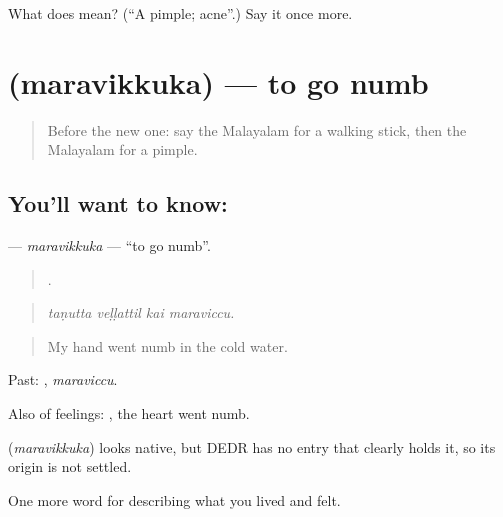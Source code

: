 \begin{tcolorbox}[breakable,colback=teal!4,colframe=teal!35!black,title={Before you move on}]
What does  mean? (\textquotedblleft{}A pimple; acne\textquotedblright{}.) Say it once more.
\end{tcolorbox}
\section[\texorpdfstring{\ml{മരവിക്കുക} (maravikkuka)}{മരവിക്കുക (maravikkuka)}]{ (maravikkuka) — to go numb}

\label{lesson:ML-C540-maravikkuka}



\begin{quote}
Before the new one: say the Malayalam for a walking stick, then the Malayalam for a pimple.
\end{quote}

\subsection*{You'll want to know: }
\textbf{} — \emph{maravikkuka} — \textquotedblleft{}to go numb\textquotedblright{}.

\begin{quote}
   .
\end{quote}

\begin{quote}
\emph{taṇutta veḷḷattil kai maraviccu.}
\end{quote}

\begin{quote}
My hand went numb in the cold water.
\end{quote}

Past: , \emph{maraviccu}.

Also of feelings:  , the heart went numb.

\begin{cousinweb}
\textbf{} (\emph{maravikkuka}) looks native, but DEDR has no entry that clearly holds it, so its origin is not settled.
\end{cousinweb}

\begin{grammarlens}[title={What you've built}]
One more word for describing what you lived and felt.
\end{grammarlens}

